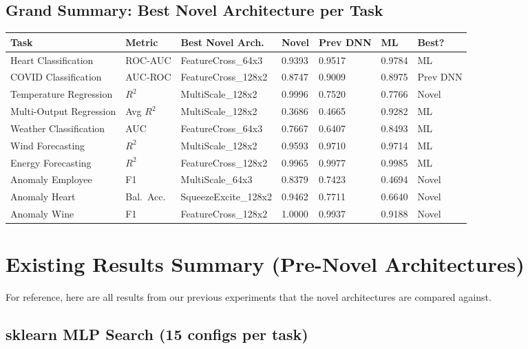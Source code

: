 \documentclass[11pt,a4paper]{article}
\begin{document}
\subsection{Grand Summary: Best Novel Architecture per Task}

\begin{center}
\small
\begin{tabular}{p{3cm}p{1.2cm}p{2.8cm}p{1.3cm}p{1.3cm}p{1.3cm}p{1cm}}
\toprule
\textbf{Task} & \textbf{Metric} & \textbf{Best Novel Arch.} & \textbf{Novel} & \textbf{Prev DNN} & \textbf{ML} & \textbf{Best?} \\
\midrule
Heart Classification & ROC-AUC & FeatureCross\_64x3 & 0.9393 & 0.9517 & 0.9784 & ML \\
COVID Classification & AUC-ROC & FeatureCross\_128x2 & 0.8747 & 0.9009 & 0.8975 & Prev DNN \\
Temperature Regression & $R^2$ & MultiScale\_128x2 & 0.9996 & 0.7520 & 0.7766 & Novel \\
Multi-Output Regression & Avg $R^2$ & MultiScale\_128x2 & 0.3686 & 0.4665 & 0.9282 & ML \\
Weather Classification & AUC & FeatureCross\_64x3 & 0.7667 & 0.6407 & 0.8493 & ML \\
Wind Forecasting & $R^2$ & MultiScale\_128x2 & 0.9593 & 0.9710 & 0.9714 & ML \\
Energy Forecasting & $R^2$ & FeatureCross\_128x2 & 0.9965 & 0.9977 & 0.9985 & ML \\
Anomaly Employee & F1 & MultiScale\_64x3 & 0.8379 & 0.7423 & 0.4694 & Novel \\
Anomaly Heart & Bal.\ Acc. & SqueezeExcite\_128x2 & 0.9462 & 0.7711 & 0.6640 & Novel \\
Anomaly Wine & F1 & FeatureCross\_128x2 & 1.0000 & 0.9937 & 0.9188 & Novel \\
\bottomrule
\end{tabular}
\end{center}




\section{Existing Results Summary (Pre-Novel Architectures)}

For reference, here are all results from our previous experiments that the novel architectures are compared against.

\subsection{sklearn MLP Search (15 configs per task)}
\end{document}
